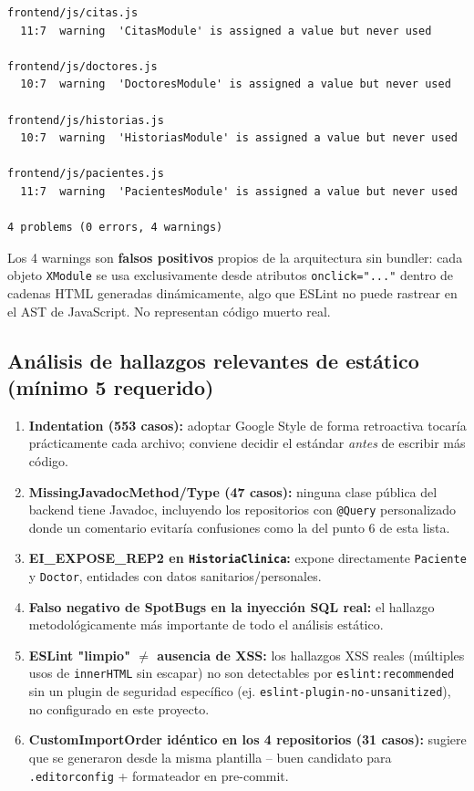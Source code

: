 \documentclass[11pt,a4paper]{article}
\begin{document}
\begin{lstlisting}
frontend/js/citas.js
  11:7  warning  'CitasModule' is assigned a value but never used

frontend/js/doctores.js
  10:7  warning  'DoctoresModule' is assigned a value but never used

frontend/js/historias.js
  10:7  warning  'HistoriasModule' is assigned a value but never used

frontend/js/pacientes.js
  11:7  warning  'PacientesModule' is assigned a value but never used

4 problems (0 errors, 4 warnings)
\end{lstlisting}

Los 4 warnings son \textbf{falsos positivos} propios de la arquitectura sin
bundler: cada objeto \texttt{XModule} se usa exclusivamente desde atributos
\texttt{onclick="..."} dentro de cadenas HTML generadas din\'amicamente, algo
que ESLint no puede rastrear en el AST de JavaScript. No representan c\'odigo
muerto real.

\subsection{An\'alisis de hallazgos relevantes de est\'atico (m\'inimo 5 requerido)}

\begin{enumerate}[leftmargin=*]
  \item \textbf{Indentation (553 casos):} adoptar Google Style de forma
    retroactiva tocar\'ia pr\'acticamente cada archivo; conviene decidir el
    est\'andar \emph{antes} de escribir m\'as c\'odigo.
  \item \textbf{MissingJavadocMethod/Type (47 casos):} ninguna clase p\'ublica
    del backend tiene Javadoc, incluyendo los repositorios con \texttt{@Query}
    personalizado donde un comentario evitar\'ia confusiones como la del
    punto 6 de esta lista.
  \item \textbf{EI\_EXPOSE\_REP2 en \texttt{HistoriaClinica}:} expone
    directamente \texttt{Paciente} y \texttt{Doctor}, entidades con datos
    sanitarios/personales.
  \item \textbf{Falso negativo de SpotBugs en la inyecci\'on SQL real:} el
    hallazgo metodol\'ogicamente m\'as importante de todo el an\'alisis
    est\'atico.
  \item \textbf{ESLint "limpio" $\neq$ ausencia de XSS:} los hallazgos XSS
    reales (m\'ultiples usos de \texttt{innerHTML} sin escapar) no son
    detectables por \texttt{eslint:recommended} sin un plugin de seguridad
    espec\'ifico (ej. \texttt{eslint-plugin-no-unsanitized}), no configurado
    en este proyecto.
  \item \textbf{CustomImportOrder id\'entico en los 4 repositorios (31
    casos):} sugiere que se generaron desde la misma plantilla -- buen
    candidato para \texttt{.editorconfig} + formateador en pre-commit.
\end{enumerate}
\end{document}
